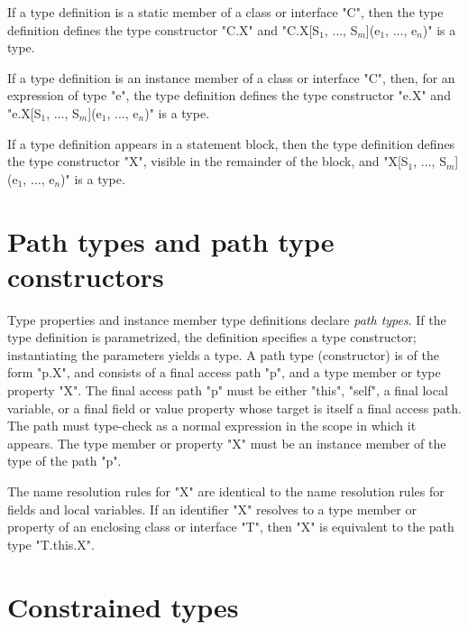         If a type definition 
        is a static member of a class or
        interface \xcd"C", then the type definition
        defines the type constructor \xcd"C.X"
and
\xcdmath"C.X[S$_1$, $\dots$, S$_m$](e$_1$, $\dots$, e$_n$)"
is a type.

        If a type definition 
        is an instance member of a class or
        interface \xcd"C", then, for an expression of type
        \xcd"e", the type definition
        defines the type constructor \xcd"e.X"
and
\xcdmath"e.X[S$_1$, $\dots$, S$_m$](e$_1$, $\dots$, e$_n$)"
is a type.

        If a type definition 
        appears in a statement block, then
        the type definition
        defines the type constructor \xcd"X", visible in the
        remainder of the block,
and
\xcdmath"X[S$_1$, $\dots$, S$_m$](e$_1$, $\dots$, e$_n$)"
is a type.

\section{Path types and path type constructors}


Type properties and instance member type definitions 
declare \emph{path types}.
If the type definition is parametrized, the definition specifies
a type constructor; instantiating the parameters yields a type.
A path type (constructor)
is of the form \xcd"p.X", and consists of a final access path
\xcd"p", and a type
member or type property \xcd"X".
The final access path \xcd"p" must be either \xcd"this", \xcd"self", a final
local variable, or a final field or value property whose target
is itself a final access path.  The path must type-check 
as a normal expression in the scope in which it appears.
The type member or property
\xcd"X" must be an instance member of the type of the
path \xcd"p".

The name resolution rules for \xcd"X" are identical to the name
resolution rules for fields and local variables.
If an identifier \xcd"X" resolves to a type member or property
of an enclosing class or interface \xcd"T", then \xcd"X" is equivalent to
the path type \xcd"T.this.X".

\section{Constrained types}
\label{ConstrainedTypes}
\label{DepType:DepType}
\label{DepTypes}

